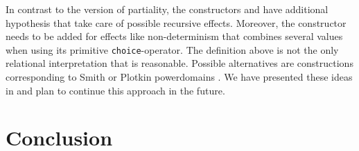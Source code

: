 {In contrast to the version of partiality, the constructors  and  have additional hypothesis that take care of possible recursive effects.
Moreover, the constructor  needs to be added for effects like non-determinism that combines several values when using its primitive \texttt{choice}-operator.
The definition above is not the only relational interpretation that is reasonable.
Possible alternatives are constructions corresponding to Smith or Plotkin powerdomains \citep{abramsky1994domain}.
We have presented these ideas in \citet{christiansen2019proving} and plan to continue this approach in the future.

\section{Conclusion}
\label{sec:conclusion}

}

